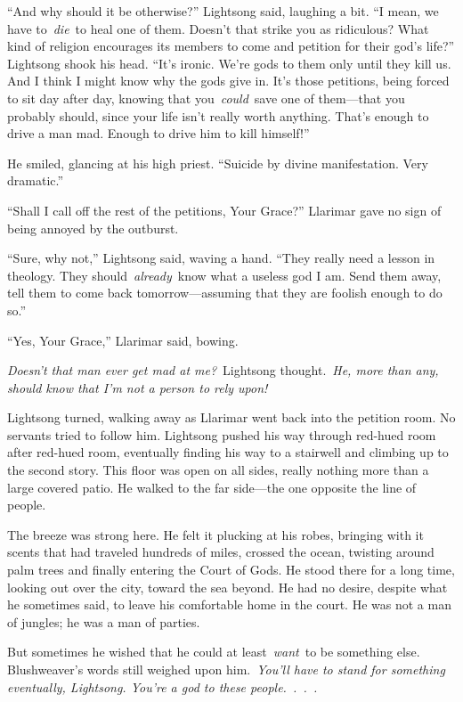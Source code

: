 “And why should it be otherwise?” Lightsong said, laughing a bit. “I mean, we have to~\textit{die}~to heal one of them. Doesn’t that strike you as ridiculous? What kind of religion encourages its members to come and petition for their god’s life?” Lightsong shook his head. “It’s ironic. We’re gods to them only until they kill us. And I think I might know why the gods give in. It’s those petitions, being forced to sit day after day, knowing that you~\textit{could}~save one of them—that you probably should, since your life isn’t really worth anything. That’s enough to drive a man mad. Enough to drive him to kill himself!”

He smiled, glancing at his high priest. “Suicide by divine manifestation. Very dramatic.”

“Shall I call off the rest of the petitions, Your Grace?” Llarimar gave no sign of being annoyed by the outburst.

“Sure, why not,” Lightsong said, waving a hand. “They really need a lesson in theology. They should~\textit{already}~know what a useless god I am. Send them away, tell them to come back tomorrow—assuming that they are foolish enough to do so.”

“Yes, Your Grace,” Llarimar said, bowing.

\textit{Doesn’t that man ever get mad at me?}~Lightsong thought.~\textit{He, more than any, should know that I’m not a person to rely upon!}

Lightsong turned, walking away as Llarimar went back into the petition room. No servants tried to follow him. Lightsong pushed his way through red-hued room after red-hued room, eventually finding his way to a stairwell and climbing up to the second story. This floor was open on all sides, really nothing more than a large covered patio. He walked to the far side—the one opposite the line of people.

The breeze was strong here. He felt it plucking at his robes, bringing with it scents that had traveled hundreds of miles, crossed the ocean, twisting around palm trees and finally entering the Court of Gods. He stood there for a long time, looking out over the city, toward the sea beyond. He had no desire, despite what he sometimes said, to leave his comfortable home in the court. He was not a man of jungles; he was a man of parties.

But sometimes he wished that he could at least~\textit{want}~to be something else. Blushweaver’s words still weighed upon him.~\textit{You’ll have to stand for something eventually, Lightsong. You’re a god to these people.~.~.~.}

